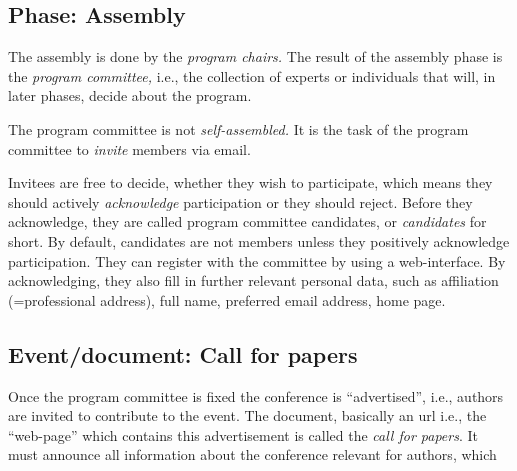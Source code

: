 \subsection{Phase: Assembly}
\label{sec:assembly}

The assembly is done by the \emph{program chairs.} The result of the
assembly phase is the \emph{program committee,} i.e., the collection of
experts or individuals that will, in later phases, decide about the
program.

The program committee is not \emph{self-assembled.} It is the task of the
program committee to \emph{invite} members via email.

Invitees are free to decide, whether they wish to participate, which means
they should actively \emph{acknowledge} participation or they should
reject. Before they acknowledge, they are called program committee
candidates, or \emph{candidates} for short. By default, candidates are not
members unless they positively acknowledge participation.  They can
register with the committee by using a web-interface. By acknowledging,
they also fill in further relevant personal data, such as affiliation
(=professional address), full name, preferred email address, home page.



\subsection{Event/document: Call for papers}
\label{sec:cfpapers}

Once the program committee is fixed the conference is ``advertised'', i.e.,
authors are invited to contribute to the event. The document, basically an
url i.e., the ``web-page'' which contains this advertisement is called the
\emph{call for papers}. It must announce all information about the
conference relevant for authors, which

